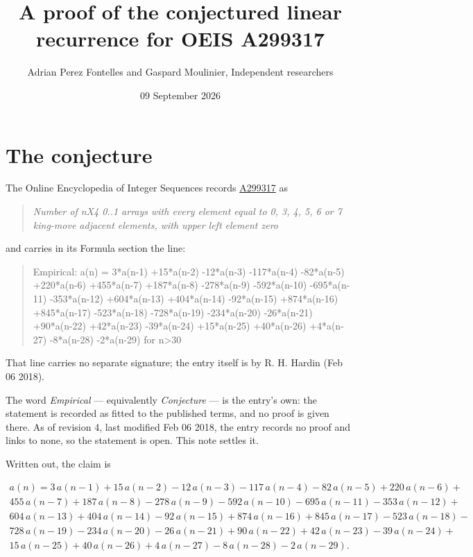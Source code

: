 \documentclass[11pt]{article}
\title{A proof of the conjectured linear recurrence for OEIS A299317}
\author{Adrian Perez Fontelles and Gaspard Moulinier, Independent researchers}
\date{09 September 2026}
\theoremstyle{definition}
\begin{document}
\maketitle
\section{The conjecture}

The Online Encyclopedia of Integer Sequences records \href{https://oeis.org/A299317}{A299317} as

\begin{quote}\itshape Number of nX4 0..1 arrays with every element equal to 0, 3, 4, 5, 6 or 7 king-move adjacent elements, with upper left element zero\end{quote}

and carries in its Formula section the line:

\begin{quote}\ttfamily Empirical: a(n) = 3*a(n-1) +15*a(n-2) -12*a(n-3) -117*a(n-4) -82*a(n-5) +220*a(n-6) +455*a(n-7) +187*a(n-8) -278*a(n-9) -592*a(n-10) -695*a(n-11) -353*a(n-12) +604*a(n-13) +404*a(n-14) -92*a(n-15) +874*a(n-16) +845*a(n-17) -523*a(n-18) -728*a(n-19) -234*a(n-20) -26*a(n-21) +90*a(n-22) +42*a(n-23) -39*a(n-24) +15*a(n-25) +40*a(n-26) +4*a(n-27) -8*a(n-28) -2*a(n-29) for n>30\end{quote}

That line carries no separate signature; the entry itself is by R. H. Hardin (Feb 06 2018).

The word {\itshape Empirical} --- equivalently {\itshape Conjecture} --- is the entry's own: the statement is recorded as fitted to the published terms, and no proof is given there. As of revision 4, last modified Feb 06 2018, the entry records no proof and links to none, so the statement is open. This note settles it.

Written out, the claim is

\begin{multline*} a(n) = 3\,a(n-1) + 15\,a(n-2) - 12\,a(n-3) - 117\,a(n-4) - 82\,a(n-5) + 220\,a(n-6) + \\ 455\,a(n-7) + 187\,a(n-8) - 278\,a(n-9) - 592\,a(n-10) - 695\,a(n-11) - 353\,a(n-12) + \\ 604\,a(n-13) + 404\,a(n-14) - 92\,a(n-15) + 874\,a(n-16) + 845\,a(n-17) - 523\,a(n-18) - \\ 728\,a(n-19) - 234\,a(n-20) - 26\,a(n-21) + 90\,a(n-22) + 42\,a(n-23) - 39\,a(n-24) + \\ 15\,a(n-25) + 40\,a(n-26) + 4\,a(n-27) - 8\,a(n-28) - 2\,a(n-29). \end{multline*}
\end{document}
